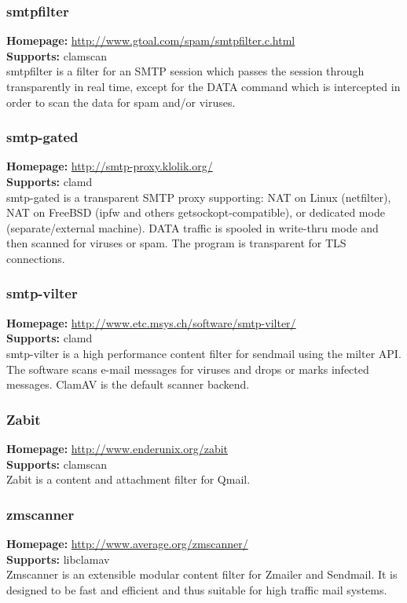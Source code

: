 \documentclass[a4paper,titlepage,12pt]{article}
\begin{document}
    \subsubsection{smtpfilter}
    \textbf{Homepage:} \url{http://www.gtoal.com/spam/smtpfilter.c.html}\\
    \textbf{Supports:} clamscan\\[4pt]
    smtpfilter is a filter for an SMTP session which passes the session through
    transparently in real time, except for the DATA command which is
    intercepted in order to scan the data for spam and/or viruses.

    \subsubsection{smtp-gated}
    \textbf{Homepage:} \url{http://smtp-proxy.klolik.org/}\\
    \textbf{Supports:} clamd\\[4pt]
    smtp-gated is a transparent SMTP proxy supporting: NAT on Linux (netfilter),
    NAT on FreeBSD (ipfw and others getsockopt-compatible), or dedicated mode
    (separate/external machine). DATA traffic is spooled in write-thru mode
    and then scanned for viruses or spam. The program is transparent for TLS
    connections.

    \subsubsection{smtp-vilter}
    \textbf{Homepage:} \url{http://www.etc.msys.ch/software/smtp-vilter/}\\
    \textbf{Supports:} clamd\\[4pt]
    smtp-vilter is a high performance content filter for sendmail
    using the milter API.  The software scans e-mail messages for
    viruses and drops or marks infected messages. ClamAV is the default
    scanner backend.

    \subsubsection{Zabit}
    \textbf{Homepage:} \url{http://www.enderunix.org/zabit}\\
    \textbf{Supports:} clamscan\\[4pt]
    Zabit is a content and attachment filter for Qmail.

    \subsubsection{zmscanner}
    \textbf{Homepage:} \url{http://www.average.org/zmscanner/}\\
    \textbf{Supports:} libclamav\\[4pt]
    Zmscanner is an extensible modular content filter for Zmailer and Sendmail.
    It is designed to be fast and efficient and thus suitable for high traffic
    mail systems.
\end{document}
